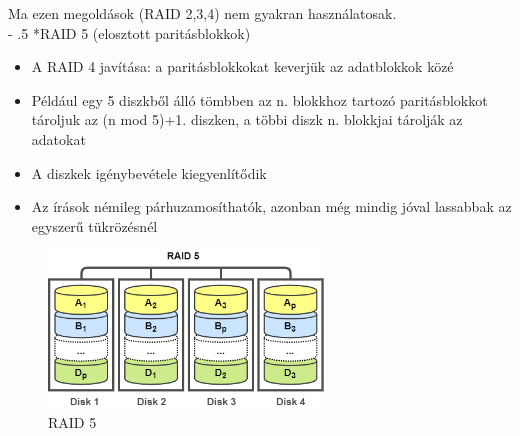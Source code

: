 \documentclass[tikz,12pt,margin=0px]{article}
\makeatletter
\renewcommand\paragraph{%
	\@startsection{paragraph}{4}{0mm}%
	{-\baselineskip}%
	{.5\baselineskip}%
	{\normalfont\normalsize\bfseries}}
\makeatother
\begin{document}
    \noindent Ma ezen megoldások (RAID 2,3,4) nem gyakran használatosak.\\
\newpage
	\paragraph*{RAID 5 (elosztott paritásblokkok)}

    \begin{itemize}[topsep=8pt,itemsep=4pt,partopsep=4pt, parsep=4pt]
        \item A RAID 4 javítása: a paritásblokkokat keverjük az adatblokkok közé
        \item Például egy 5 diszkből álló tömbben az n. blokkhoz tartozó paritásblokkot tároljuk az (n mod 5)+1. diszken, a többi diszk n. blokkjai tárolják az adatokat
        \item A diszkek igénybevétele kiegyenlítődik
        \item Az írások némileg párhuzamosíthatók, azonban még mindig jóval lassabbak az egyszerű tükrözésnél
    \end{itemize}

    \begin{figure}[H]
        \centering
        \includegraphics[width=0.65\textwidth]{img/raid5.png}
        \caption{RAID 5}
        \label{ref:raid5}
    \end{figure}
\end{document}
